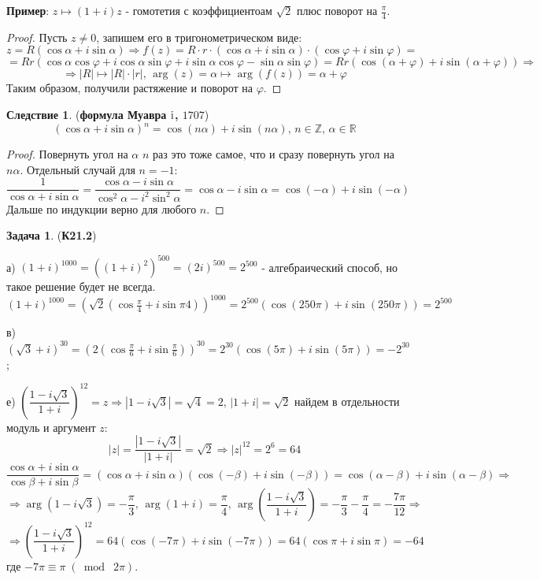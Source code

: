 \documentclass[12pt]{article}
\newcommand{\RN}[1]{%
	\textup{\uppercase\expandafter{\romannumeral#1}}%
}
\newcommand{\MR}{\mathbb{R}}
\newcommand{\MZ}{\mathbb{Z}}
\theoremstyle{definition}
\newtheorem{problem}{Задача}
\newtheorem{corollary}{Следствие}
\newcommand{\modn}[3]{#1 \equiv #2 \; (\bmod \; #3)}
\begin{document}
\textbf{Пример}: $z \mapsto (1 + i)z$ - гомотетия с коэффициентоам $\sqrt{2}$ плюс поворот на $\tfrac{\pi}{4}$.
\begin{proof}
	Пусть $z \neq 0$, запишем его в тригонометрическом виде:
	$$
		z = R(\cos\alpha + i\sin\alpha)\Rightarrow f(z) = R{\cdot}r{\cdot}(\cos\alpha + i\sin\alpha){\cdot}(\cos\varphi + i\sin\varphi) = 	
	$$
	$$
		=Rr(\cos\alpha \cos\varphi +i\cos\alpha\sin\varphi + i\sin\alpha\cos\varphi - \sin\alpha\sin\varphi) = Rr(\cos(\alpha + \varphi) + i\sin(\alpha + \varphi)) \Rightarrow
	$$
	$$
		\Rightarrow |R| \mapsto |R|{\cdot}|r|, \, \arg(z) = \alpha \mapsto \arg(f(z)) = \alpha + \varphi
	$$
	Таким образом, получили растяжение и поворот на $\varphi$.
\end{proof}

\begin{corollary}(\textbf{формула Муавра $\RN{1}$, $1707$})
	$$
		(\cos\alpha + i\sin\alpha)^n = \cos(n\alpha) + i\sin(n\alpha), \, n\in\MZ, \, \alpha \in \MR
	$$
\end{corollary}
\begin{proof}
	Повернуть угол на $\alpha$ $n$ раз это тоже самое, что и сразу повернуть угол на $n\alpha$. Отдельный случай для $n = -1$:
	$$
		\dfrac{1}{\cos\alpha + i\sin\alpha} = \dfrac{\cos\alpha - i\sin\alpha}{\cos^2\alpha - i^2\sin^2\alpha} = \cos\alpha - i\sin\alpha = \cos(-\alpha) + i\sin(-\alpha)
	$$
	Дальше по индукции верно для любого $n$.
\end{proof}

\begin{problem}(\textbf{К21.2})
	
	а) $(1 + i)^{1000} = ((1 +i)^2)^{500} = (2i)^{500} = 2^{500}$ - алгебраический способ, но такое решение будет не всегда.
	$$
		(1 + i)^{1000} = \left(\sqrt{2}\left(\cos\tfrac{\pi}{4} + i\sin{\pi}{4} \right)\right)^{1000} = 2^{500}(\cos(250\pi) + i\sin(250\pi)) = 2^{500}
	$$
	
	в) $(\sqrt{3} + i)^{30} = \left(2\left(\cos\tfrac{\pi}{6} + i\sin\tfrac{\pi}{6}\right)\right)^{30} =2^{30}\left(\cos(5\pi) + i\sin(5\pi) \right) = -2^{30}$;
	
	е) $\left(\dfrac{1 - i\sqrt{3}}{1 + i}\right)^{12} = z \Rightarrow |1 - i\sqrt{3}| = \sqrt{4} = 2, \, |1 +i| = \sqrt{2}$ найдем в отдельности модуль и аргумент $z$:
	$$
		|z| = \dfrac{|1 - i\sqrt{3}|}{|1 + i|} = \sqrt{2} \Rightarrow |z|^{12} = 2^6 = 64
	$$
	$$
		\dfrac{\cos\alpha + i\sin\alpha}{\cos\beta + i\sin\beta} = (\cos\alpha + i \sin\alpha)(\cos(-\beta) + i\sin(-\beta)) = \cos(\alpha - \beta) + i\sin(\alpha - \beta) \Rightarrow
	$$
	$$
		\Rightarrow \arg(1 - i\sqrt{3}) = - \dfrac{\pi}{3}, \, \arg(1 + i) = \dfrac{\pi}{4}, \, \arg\left(\dfrac{1 - i\sqrt{3}}{1 + i}\right) = -\dfrac{\pi}{3} - \dfrac{\pi}{4} = -\dfrac{7\pi}{12} \Rightarrow 
	$$
	$$	
		\Rightarrow \left(\dfrac{1 - i\sqrt{3}}{1 + i}\right)^{12}  =64(\cos(-7\pi) + i\sin(-7\pi)) = 64(\cos\pi + i\sin\pi)= -64
	$$
	где $\modn{-7\pi}{\pi}{2\pi}$.
\end{problem}
\end{document}

